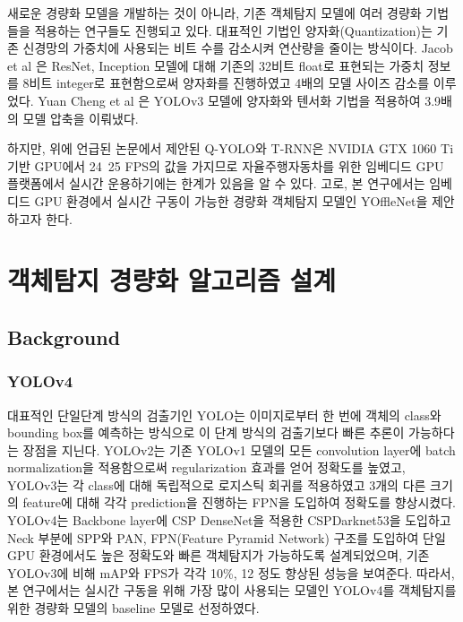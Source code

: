 \documentclass[10pt,twocolumn,letterpaper]{article}
\begin{document}
새로운 경량화 모델을 개발하는 것이 아니라, 기존 객체탐지 모델에 여러 경량화 기법들을 적용하는 연구들도 진행되고 있다. 대표적인 기법인 양자화(Quantization)는 기존 신경망의 가중치에 사용되는 비트 수를 감소시켜 연산량을 줄이는 방식이다. Jacob et al \cite{jacob2018quantization}은 ResNet, Inception 모델에 대해 기존의 32비트 float로 표현되는 가중치 정보를 8비트 integer로 표현함으로써 양자화를 진행하였고 4배의 모델 사이즈 감소를 이루었다. Yuan Cheng et al \cite{cheng2018deepeye}은 YOLOv3 모델에 양자화와 텐서화 기법을 적용하여 3.9배의 모델 압축을 이뤄냈다. 

하지만, 위에 언급된 논문에서 제안된 Q-YOLO와 T-RNN은 NVIDIA GTX 1060 Ti 기반 GPU에서 24~25 FPS의 값을 가지므로 자율주행자동차를 위한 임베디드 GPU 플랫폼에서 실시간 운용하기에는 한계가 있음을 알 수 있다. 고로, 본 연구에서는 임베디드 GPU 환경에서 실시간 구동이 가능한 경량화 객체탐지 모델인 YOffleNet을 제안하고자 한다.

\vspace{.25cm}
\section{객체탐지 경량화 알고리즘 설계}
\vspace{.25cm}
\subsection{Background}

\vspace{.15cm}
\subsubsection{YOLOv4}
대표적인 단일단계 방식의 검출기인 YOLO는 이미지로부터 한 번에 객체의 class와 bounding box를 예측하는 방식으로 이 단계 방식의 검출기보다 빠른 추론이 가능하다는 장점을 지닌다. YOLOv2는 기존 YOLOv1 모델의 모든 convolution layer에 batch normalization을 적용함으로써 regularization 효과를 얻어 정확도를 높였고, YOLOv3는 각 class에 대해 독립적으로 로지스틱 회귀를 적용하였고 3개의 다른 크기의 feature에 대해 각각 prediction을 진행하는 FPN을 도입하여 정확도를 향상시켰다. YOLOv4는 Backbone layer에 CSP DenseNet을 적용한 CSPDarknet53을 도입하고 Neck 부분에 SPP와 PAN, FPN(Feature Pyramid Network) 구조를 도입하여 단일 GPU 환경에서도 높은 정확도와 빠른 객체탐지가 가능하도록 설계되었으며, 기존 YOLOv3에 비해 mAP와 FPS가 각각 10\%, 12 정도 향상된 성능을 보여준다. 따라서, 본 연구에서는 실시간 구동을 위해 가장 많이 사용되는 모델인 YOLOv4를 객체탐지를 위한 경량화 모델의 baseline 모델로 선정하였다.
\end{document}
